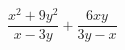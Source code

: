 \begin{ex}
	\begin{condition}
		\( \dfrac{x^2+9y^2}{x-3y}+\dfrac{6xy}{3y-x} \)
	\end{condition}
\end{ex}
